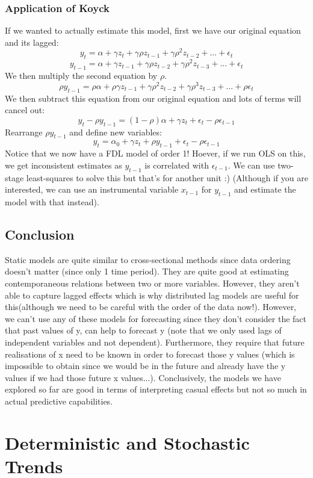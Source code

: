\documentclass[11pt, oneside]{article}
\theoremstyle{definition}
\begin{document}
\subsubsection{Application of Koyck}
If we wanted to actually estimate this model, first we have our original equation and its lagged:
$$
y_t = \alpha + \gamma z_t + \gamma \rho z_{t-1} + \gamma \rho^2 z_{t-2} + ... + \epsilon_t
$$
$$
y_{t-1} = \alpha + \gamma z_{t-1} + \gamma \rho z_{t-2} + \gamma \rho^2 z_{t-3} + ... + \epsilon_t
$$
We then multiply the second equation by $\rho$.
$$
\rho y_{t-1} = \rho\alpha + \rho\gamma z_{t-1} + \gamma \rho^2 z_{t-2} + \gamma \rho^3 z_{t-3} + ... + \rho\epsilon_t
$$
We then subtract this equation from our original equation and lots of terms will cancel out:
$$
y_t - \rho y_{t-1} = (1 - \rho)\alpha + \gamma z_t + \epsilon_t - \rho\epsilon_{t-1}
$$
Rearrange $\rho y_{t-1}$ and define new variables:
$$
y_t  = \alpha_0 + \gamma z_t + \rho y_{t-1} + \epsilon_t - \rho\epsilon_{t-1}
$$
Notice that we now have a FDL model of order 1! Hoever, if we run OLS on this, we get inconsistent estimates as $y_{t-1}$ is correlated with $\epsilon_{t-1}$. We can use two-stage least-squares to solve this but that's for another unit :) (Although if you are interested, we can use an instrumental variable $x_{t-1}$ for $y_{t-1}$ and estimate the model with that instead).
\subsection{Conclusion}
Static models are quite similar to cross-sectional methods since data ordering doesn't matter (since only 1 time period). They are quite good at estimating contemporaneous relations between two or more variables. However, they aren't able to capture lagged effects which is why distributed lag models are useful for this(although we need to be careful with the order of the data now!). However, we can't use any of these models for forecasting since they don't consider the fact that past values of y, can help to forecast y (note that we only used lags of independent variables and not dependent). Furthermore, they require that future realisations of x need to be known in order to forecast those y values (which is impossible to obtain since we would be in the future and already have the y values if we had those future x values...). Conclusively, the models we have explored so far are good in terms of interpreting casual effects but not so much in actual predictive capabilities.

\newpage
\section{Deterministic and Stochastic Trends}
\end{document}
